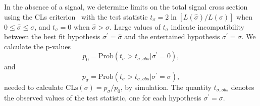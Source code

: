 In the absence of  a signal, we determine limits on the total signal cross section using the CLs
criterion~\cite{LHCCLs} with the test statistic 
$t_\sigma = 2 \ln [ L(\hat{\sigma}) / L(\sigma)]$ when $0 \leq\hat{\sigma} \leq
\sigma$, 
and $t_\sigma = 0$ when $\hat{\sigma} > \sigma$. 
Large values of $t_\sigma$ indicate incompatibility between the best fit hypothesis 
$\sigma^\prime = \hat{\sigma}$ and the entertained hypothesis $\sigma^\prime  = \sigma$. 
We calculate the p-values 
\begin{equation}
p_0 = \textrm{Prob}(t_\sigma > t_{\sigma, obs} | \sigma^\prime = 0) ,
\end{equation}
and 
\begin{equation}
p_\sigma = \textrm{Prob}(t_\sigma > t_{\sigma, obs} | \sigma^\prime=\sigma) ,
\end{equation}
needed to calculate $\textrm{CLs}(\sigma) = p_\sigma / p_0$,  by simulation. 
The quantity $t_{\sigma, obs}$ denotes the observed values of the test statistic, one for each
hypothesis $\sigma^\prime=\sigma$.


